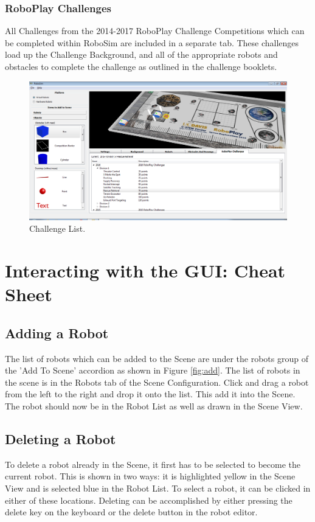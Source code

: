 \documentclass{article}
\begin{document}
\subsubsection{RoboPlay Challenges}
All Challenges from the 2014-2017 RoboPlay Challenge Competitions which can be
completed within RoboSim are included in a separate tab.  These challenges load
up the Challenge Background, and all of the appropriate robots and obstacles to
complete the challenge as outlined in the challenge booklets.
\begin{figure}[H]
	\begin{center}
		\includegraphics[width=6in]{pictures/gui_challenges}
	\end{center}
	\caption{Challenge List.}
	\label{fig:challenges}
\end{figure}

%
%
\section{Interacting with the GUI: Cheat Sheet}
\subsection{Adding a Robot}
The list of robots which can be added to the Scene are under the robots group
of the 'Add To Scene' accordion as shown in Figure \ref{fig:add}.  The list of
robots in the scene is in the Robots tab of the Scene Configuration.  Click and
drag a robot from the left to the right and drop it onto the list.  This add it
into the Scene.  The robot should now be in the Robot List as well as drawn in
the Scene View.

\subsection{Deleting a Robot}
To delete a robot already in the Scene, it first has to be selected to become
the current robot.  This is shown in two ways: it is highlighted yellow in the
Scene View and is selected blue in the Robot List.  To select a robot, it can
be clicked in either of these locations.  Deleting can be accomplished by
either pressing the delete key on the keyboard or the delete button in the
robot editor.
\end{document}
